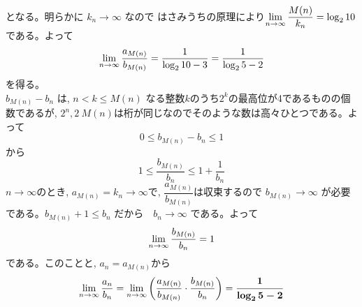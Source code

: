 となる。明らかに $k_n\to \infty$ なので はさみうちの原理により$\displaystyle\lim_{n\to \infty} \dfrac{M(n)}{k_n}=\log_2{10}$である。よって
\[\displaystyle\lim_{n\to \infty}\dfrac{a_{M(n)}}{b_{M(n)}}=\dfrac{1}{\log_2{10}-3}=\dfrac{1}{\log_2{5}-2}\]
を得る。\\
$b_{M(n)}-b_n$ は, $ n< k\leq M(n)$ なる整数$k$のうち$2^k$の最高位が4であるものの個数であるが, $2^n, 2~{M(n)}$は桁が同じなのでそのような数は高々ひとつである。よって
\[0\leq b_{M(n)}-b_n\leq 1\]
から
\[1\leq \dfrac{b_{M(n)}}{b_{n}}\leq 1+\dfrac{1}{b_n}\]
$n\to \infty$のとき, $a_{M(n)}=k_n\to \infty$で, $\dfrac{a_{M(n)}}{b_{M(n)}}$は収束するので $b_{M(n)}\to \infty$ が必要である。$b_{M(n)}+1\leq b_n$ だから　$b_n\to \infty$ である。よって
\[\displaystyle\lim_{n\to \infty} \dfrac{b_{M(n)}}{b_n}=1\]
である。このことと, $a_n=a_{M(n)}$から
\[\displaystyle\lim_{n\to \infty}\dfrac{a_n}{b_n}=\displaystyle\lim_{n\to \infty} \left(\dfrac{a_{M(n)}}{b_{M(n)}}\cdot \dfrac{b_{M(n)}}{b_n}\right) = \mbox{{\boldmath $\dfrac{1}{\log_2{5}-2}$}}\]
